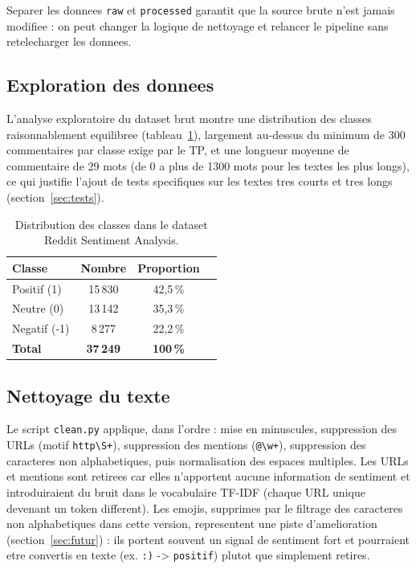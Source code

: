 \documentclass[11pt,a4paper]{article}
\begin{document}
Separer les donnees \texttt{raw} et \texttt{processed} garantit que la source brute n'est jamais modifiee : on peut changer la logique de nettoyage et relancer le pipeline sans retelecharger les donnees.

\subsection{Exploration des donnees}

L'analyse exploratoire du dataset brut montre une distribution des classes raisonnablement equilibree (tableau~\ref{tab:dist}), largement au-dessus du minimum de 300 commentaires par classe exige par le TP, et une longueur moyenne de commentaire de 29 mots (de 0 a plus de 1300 mots pour les textes les plus longs), ce qui justifie l'ajout de tests specifiques sur les textes tres courts et tres longs (section~\ref{sec:tests}).

\begin{table}[h]
\centering
\begin{tabular}{@{}lccc@{}}
\toprule
\textbf{Classe} & \textbf{Nombre} & \textbf{Proportion} \\
\midrule
Positif (1) & 15\,830 & 42,5\,\% \\
Neutre (0) & 13\,142 & 35,3\,\% \\
Negatif (-1) & 8\,277 & 22,2\,\% \\
\midrule
\textbf{Total} & \textbf{37\,249} & \textbf{100\,\%} \\
\bottomrule
\end{tabular}
\caption{Distribution des classes dans le dataset Reddit Sentiment Analysis.}
\label{tab:dist}
\end{table}

\subsection{Nettoyage du texte}

Le script \texttt{clean.py} applique, dans l'ordre : mise en minuscules, suppression des URLs (motif \texttt{http\textbackslash S+}), suppression des mentions (\texttt{@\textbackslash w+}), suppression des caracteres non alphabetiques, puis normalisation des espaces multiples. Les URLs et mentions sont retirees car elles n'apportent aucune information de sentiment et introduiraient du bruit dans le vocabulaire TF-IDF (chaque URL unique devenant un token different). Les emojis, supprimes par le filtrage des caracteres non alphabetiques dans cette version, representent une piste d'amelioration (section~\ref{sec:futur}) : ils portent souvent un signal de sentiment fort et pourraient etre convertis en texte (ex. \texttt{:)} -> \texttt{positif}) plutot que simplement retires.
\end{document}

